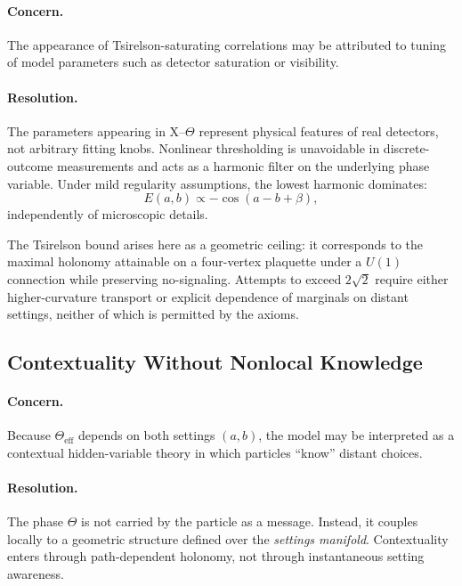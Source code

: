 \paragraph{Concern.}
The appearance of Tsirelson-saturating correlations may be attributed to tuning of
model parameters such as detector saturation or visibility.

\paragraph{Resolution.}
The parameters appearing in X--$\Theta$ represent physical features of real detectors,
not arbitrary fitting knobs.
Nonlinear thresholding is unavoidable in discrete-outcome measurements and acts
as a harmonic filter on the underlying phase variable.
Under mild regularity assumptions, the lowest harmonic dominates:
\begin{equation}
E(a,b) \propto -\cos(a-b+\beta),
\end{equation}
independently of microscopic details.

The Tsirelson bound arises here as a geometric ceiling: it corresponds to the maximal
holonomy attainable on a four-vertex plaquette under a $U(1)$ connection while preserving
no-signaling.
Attempts to exceed $2\sqrt{2}$ require either higher-curvature transport or explicit
dependence of marginals on distant settings, neither of which is permitted by the axioms.

\subsection{Contextuality Without Nonlocal Knowledge}

\paragraph{Concern.}
Because $\Theta_{\mathrm{eff}}$ depends on both settings $(a,b)$, the model may be
interpreted as a contextual hidden-variable theory in which particles ``know'' distant
choices.

\paragraph{Resolution.}
The phase $\Theta$ is not carried by the particle as a message.
Instead, it couples locally to a geometric structure defined over the
\emph{settings manifold}.
Contextuality enters through path-dependent holonomy, not through instantaneous
setting awareness.

